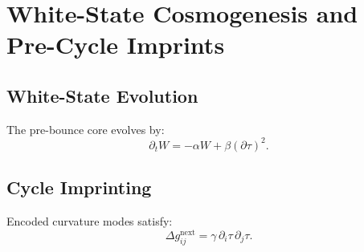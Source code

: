\chapter{White-State Cosmogenesis and Pre-Cycle Imprints}

\section{White-State Evolution}
The pre-bounce core evolves by:
\[
\partial_t W = -\alpha W + \beta (\partial\tau)^2.
\]

\section{Cycle Imprinting}
Encoded curvature modes satisfy:
\[
\Delta g_{ij}^{\mathrm{next}} = \gamma\, \partial_i\tau\,\partial_j\tau.
\]

